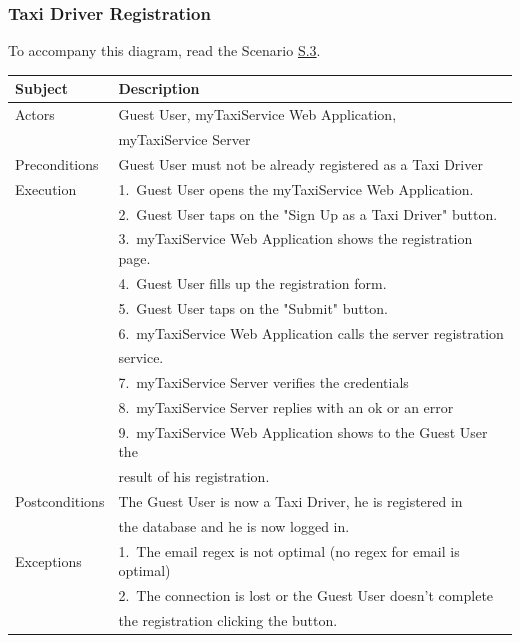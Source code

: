 \subsubsection{Taxi Driver Registration}
			To accompany this diagram, read the Scenario \hyperref[sec:TaxiDriverRegistrationScenario]{S.3}.

				\begin{table}[htpb]
					\centering
					\label{tab:TaxiDriverRegistrationDiagramTable}
					\begin{tabularx}{\textwidth}{lp{9cm}}
						\hline
						\hline
							\textbf{Subject}
						& 
							\textbf{Description}\\
						\hline
							Actors	       &  Guest User, myTaxiService Web Application, \\
										   &  myTaxiService Server\\
						\hline
							Preconditions  &  Guest User must not be already registered as a Taxi Driver\\
						\hline
							Execution      &  1.~Guest User opens the myTaxiService Web Application.\\
										   &  2.~Guest User taps on the "Sign Up as a Taxi Driver" button.\\
										   &  3.~myTaxiService Web Application shows the registration page.\\
										   &  4.~Guest User fills up the registration form.\\
										   &  5.~Guest User taps on the "Submit" button.\\
										   &  6.~myTaxiService Web Application calls the server registration\\
										   &     service.\\
										   &  7.~myTaxiService Server verifies the credentials\\
										   &  8.~myTaxiService Server replies with an ok or an error\\
										   &  9.~myTaxiService Web Application shows to the Guest User the\\
										   &     result of his registration.\\
						\hline
							Postconditions &  The Guest User is now a Taxi Driver, he is registered in \\ 
										   &  the database and he is now logged in.\\
						\hline
							Exceptions     &  1.~The email regex is not optimal (no regex for email is optimal)\\
										   &  2.~The connection is lost or the Guest User doesn't complete\\ 
										   &     the registration clicking the button.\\
									
						\hline
						\hline
					\end{tabularx}
				\end{table}
				


